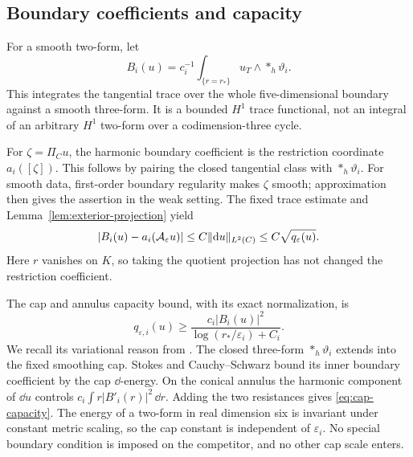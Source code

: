 \subsection{Boundary coefficients and capacity}

For a smooth two-form, let
\begin{equation}\label{eq:boundary-coefficient}
 B_i(u)=c_i^{-1}\int_{\{r=r_*\}}u_T\wedge *_h\vartheta_i.
\end{equation}
This integrates the tangential trace over the whole five-dimensional
boundary against a smooth three-form. It is a bounded $H^1$ trace
functional, not an integral of an arbitrary $H^1$ two-form over a
codimension-three cycle.

For $\zeta=\Pi_Cu$, the harmonic boundary coefficient is the
restriction coordinate $a_i([\zeta])$. This follows by pairing the
closed tangential class with $*_h\vartheta_i$. For smooth data,
first-order boundary regularity makes $\zeta$ smooth; approximation
then gives the assertion in the weak setting. The fixed trace
estimate and Lemma~\ref{lem:exterior-projection} yield
\begin{equation}\label{eq:boundary-observer-error}
 |B_i(u)-a_i(\mathcal A_\varepsilon u)|
       \le C\|\mathrm d u\|_{L^2(C)}
       \le C\sqrt{q_\varepsilon(u)}.
\end{equation}
Here $r$ vanishes on $K$, so taking the quotient projection has not
changed the restriction coefficient.

The cap and annulus capacity bound, with its exact normalization, is
\begin{equation}\label{eq:cap-capacity}
 q_{\varepsilon,i}(u)
       \ge\frac{c_i|B_i(u)|^2}
                    {\log(r_*/\varepsilon_i)+C_i}.
\end{equation}
We recall its variational reason from
\cite[Section~4]{wuebben-hodge}. The closed three-form
$*_h\vartheta_i$ extends into the fixed smoothing cap. Stokes and
Cauchy--Schwarz bound its inner boundary coefficient by the cap
$\dd$-energy. On the conical annulus the harmonic component of
$\dd u$ controls $c_i\int r|B'_i(r)|^2\,\dd r$. Adding the two
resistances gives \eqref{eq:cap-capacity}. The energy of a two-form
in real dimension six is invariant under constant metric scaling,
so the cap constant is independent of $\varepsilon_i$. No special
boundary condition is imposed on the competitor, and no other cap
scale enters.

